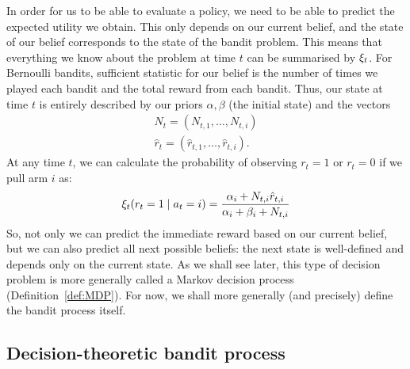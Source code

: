 In order for us to be able to evaluate a policy, we need to be able to
predict the expected utility we obtain. This only depends on our
current belief, and the state of our belief corresponds to the state
of the bandit problem. This means that
everything we know about the problem at time $t$ can be summarised by
$\xi_t$. For Bernoulli bandits, sufficient statistic for our belief
is the number of times we played each bandit and the total reward from
each bandit.  Thus, our state at time $t$ is entirely described by our
priors $\alpha, \beta$ (the initial state) and the vectors
\begin{align}
  N_t = (N_{t,1}, \ldots, N_{t,i})\\
  \hat{r}_t = (\hat{r}_{t,1}, \ldots, \hat{r}_{t,i}).
\end{align}
At any time $t$, we can calculate the probability of observing
$r_t = 1$ or $r_t = 0$ if we pull arm $i$ as:
\[
\xi_t(r_t = 1 \mid a_t = i) = \frac{\alpha_i + N_{t,i} \hat{r}_{t,i}}{\alpha_i + \beta_i + N_{t,i}}
\]
So, not only we can predict the immediate reward based on our current
belief, but we can also predict all next possible beliefs: the next
state is well-defined and depends only on the current state.  As we
shall see later, this type of decision problem is more generally called a Markov
decision process (Definition~\ref{def:MDP}). For now, we shall more generally (and precisely) define the bandit process itself.

\subsection{Decision-theoretic bandit process}
\label{sec:decision-theoretic-bandits}

